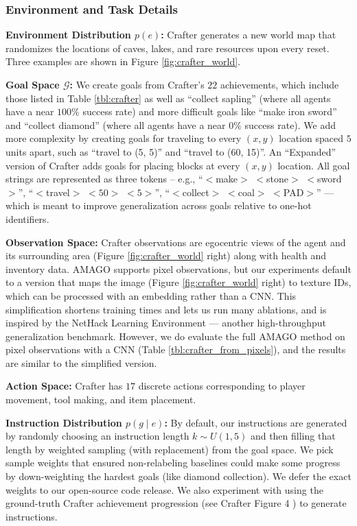 \subsubsection{Environment and Task Details}

\textbf{Environment Distribution $p(e)$:} Crafter generates a new world map that randomizes the locations of caves, lakes, and rare resources upon every reset. Three examples are shown in Figure \ref{fig:crafter_world}. 

\textbf{Goal Space $\mathcal{G}$:} We create goals from Crafter's $22$ achievements, which include those listed in Table \ref{tbl:crafter} as well as ``collect sapling'' (where all agents have a near $100\%$ success rate) and more difficult goals like ``make iron sword'' and ``collect diamond'' (where all agents have a near $0\%$ success rate). We add more complexity by creating goals for traveling to every $(x, y)$ location spaced $5$ units apart, such as ``travel to (5, 5)'' and ``travel to (60, 15)''. An ``Expanded'' version of Crafter adds goals for placing blocks at every $(x, y)$ location. All goal strings are represented as three tokens -- e.g., ``$<$make$>$ $<$stone$>$ $<$sword$>$'', ``$<$travel$>$ $<50>$ $<5>$'', ``$<$collect$>$ $<$coal$>$ $<$PAD$>$'' --- which is meant to improve generalization across goals relative to one-hot identifiers.

\textbf{Observation Space:} Crafter observations are egocentric views of the agent and its surrounding area (Figure \ref{fig:crafter_world} right) along with health and inventory data. AMAGO supports pixel observations, but our experiments default to a version that maps the image (Figure \ref{fig:crafter_world} right) to texture IDs, which can be processed with an embedding rather than a CNN. This simplification shortens training times and lets us run many ablations, and is inspired by the NetHack Learning Environment \cite{kuttler2020nethack} --- another high-throughput generalization benchmark. However, we do evaluate the full AMAGO method on pixel observations with a CNN (Table \ref{tbl:crafter_from_pixels}), and the results are similar to the simplified version.

\textbf{Action Space:} Crafter has $17$ discrete actions corresponding to player movement, tool making, and item placement.

\textbf{Instruction Distribution $p(g \mid e)$:} By default, our instructions are generated by randomly choosing an instruction length $k \sim U(1, 5)$ and then filling that length by weighted sampling (with replacement) from the goal space. We pick sample weights that ensured non-relabeling baselines could make some progress by down-weighting the hardest goals (like diamond collection). We defer the exact weights to our open-source code release. We also experiment with using the ground-truth Crafter achievement progression (see Crafter Figure 4 \cite{hafner2021benchmarking}) to generate instructions.

